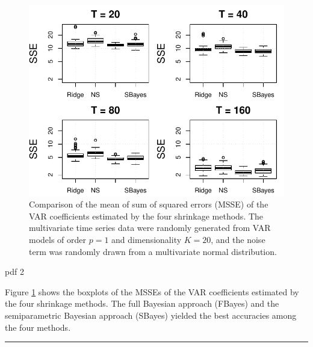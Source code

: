 \documentclass[
]{jss}
\begin{document}
\begin{CodeChunk}
\begin{figure}

{\centering \includegraphics{article_jss_varshrink_files/figure-latex/comparisons_K20-1} 

}

\caption{\label{fig:comparisons_K20}Comparison of the mean of sum of squared errors (MSSE) of the VAR coefficients estimated by the four shrinkage methods. The multivariate time series data were randomly generated from VAR models of order $p = 1$ and dimensionality $K = 20$, and the noise term was randomly drawn from a multivariate normal distribution.}\label{fig:comparisons_K20}
\end{figure}
\end{CodeChunk}

\begin{CodeChunk}

\begin{CodeOutput}
pdf 
  2 
\end{CodeOutput}
\end{CodeChunk}

Figure \ref{fig:comparisons_K20} shows the boxplots of the MSSEs of the
VAR coefficients estimated by the four shrinkage methods. The full
Bayesian approach (FBayes) and the semiparametric Bayesian approach
(SBayes) yielded the best accuracies among the four methods.

\begin{center}\rule{0.5\linewidth}{\linethickness}\end{center}
\end{document}
